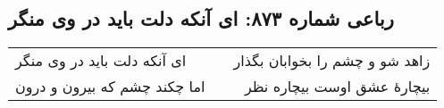 \begin{center}
\section*{رباعی شماره ۸۷۳: ای آنکه دلت باید در وی منگر}
\label{sec:0873}
\begin{longtable}{l p{0.5cm} r}
ای آنکه دلت باید در وی منگر
&&
زاهد شو و چشم را بخوابان بگذار
\\
اما چکند چشم که بیرون و درون
&&
بیچارهٔ عشق اوست بیچاره نظر
\\
\end{longtable}
\end{center}

